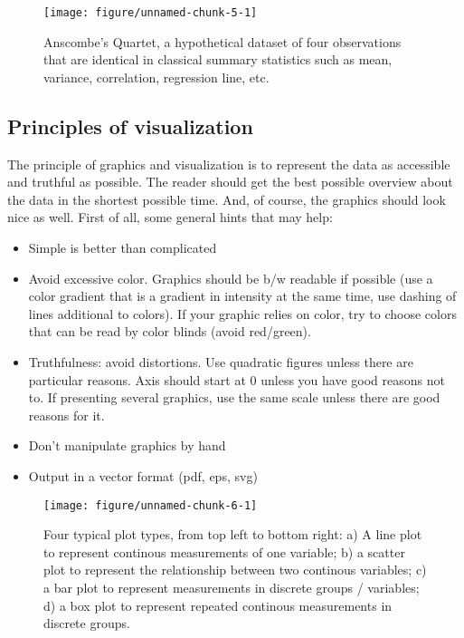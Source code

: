 \documentclass[a4paper,twoside]{tufte-book}\usepackage[]{graphicx}\usepackage[]{color}
\makeatletter
\def\maxwidth{ %
	\ifdim\Gin@nat@width>\linewidth
	\linewidth
	\else
	\Gin@nat@width
	\fi
}
\makeatother
\begin{document}
\begin{figure}[htbp]
\begin{center}
\begin{Schunk}

\texttt{[image: figure/unnamed-chunk-5-1]} \end{Schunk}
\caption{Anscombe's Quartet, a hypothetical dataset of four observations that are identical in classical summary statistics such as mean, variance, correlation, regression line, etc.}
\label{fig: Anscombes Quartet}
\end{center}
\end{figure}


\subsection{Principles of visualization}

The principle of graphics and visualization is to represent the data as accessible and truthful as possible. The reader should get the best possible overview about the data in the shortest possible time. And, of course, the graphics should look nice as well. First of all, some general hints that may help:

\begin{itemize}
\item Simple is better than complicated
\item Avoid excessive color. Graphics should be b/w readable if possible (use a color gradient that is a gradient in intensity at the same time, use dashing of lines additional to colors). If your graphic relies on color, try to choose colors that can be read by color blinds (avoid red/green).
\item Truthfulness: avoid distortions. Use quadratic figures unless there are particular reasons. Axis should start at 0 unless you have good reasons not to. If presenting several graphics, use the same scale unless there are good reasons for it. 
\item Don't manipulate graphics by hand
\item Output in a vector format (pdf, eps, svg)
\end{itemize}

\begin{figure}[htbp]
\begin{center}

\begin{Schunk}

\texttt{[image: figure/unnamed-chunk-6-1]} \end{Schunk}
\caption{Four typical plot types, from top left to bottom right: a) A line plot to represent continous measurements of one variable; b) a scatter plot to represent the relationship between two continous variables; c) a bar plot to represent measurements in discrete groups / variables; d) a box plot to represent repeated continous measurements in discrete groups.}
\label{fig: exaple plots}
\end{center}
\end{figure}
\end{document}
